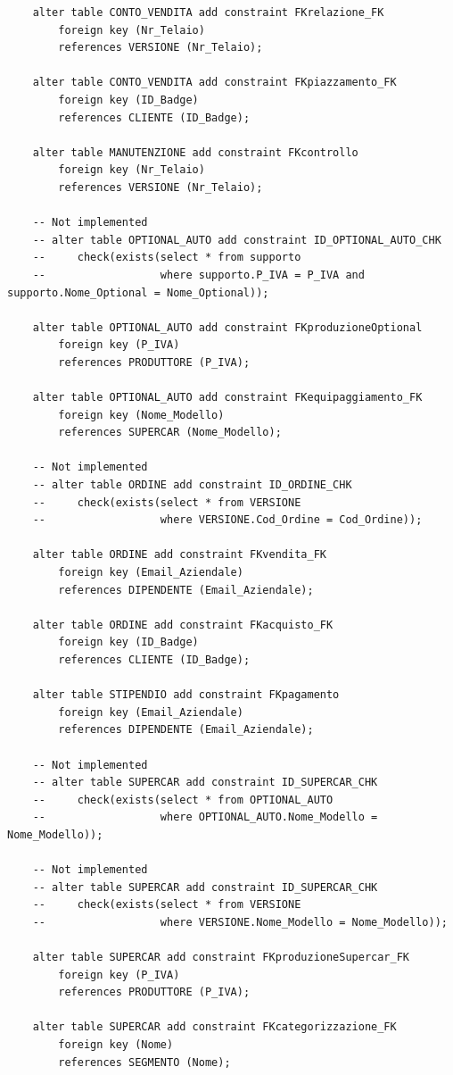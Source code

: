 \documentclass[11pt]{article}
\begin{document}
\begin{lstlisting}
    alter table CONTO_VENDITA add constraint FKrelazione_FK
        foreign key (Nr_Telaio)
        references VERSIONE (Nr_Telaio);

    alter table CONTO_VENDITA add constraint FKpiazzamento_FK
        foreign key (ID_Badge)
        references CLIENTE (ID_Badge);

    alter table MANUTENZIONE add constraint FKcontrollo
        foreign key (Nr_Telaio)
        references VERSIONE (Nr_Telaio);

    -- Not implemented
    -- alter table OPTIONAL_AUTO add constraint ID_OPTIONAL_AUTO_CHK
    --     check(exists(select * from supporto
    --                  where supporto.P_IVA = P_IVA and supporto.Nome_Optional = Nome_Optional)); 

    alter table OPTIONAL_AUTO add constraint FKproduzioneOptional
        foreign key (P_IVA)
        references PRODUTTORE (P_IVA);

    alter table OPTIONAL_AUTO add constraint FKequipaggiamento_FK
        foreign key (Nome_Modello)
        references SUPERCAR (Nome_Modello);

    -- Not implemented
    -- alter table ORDINE add constraint ID_ORDINE_CHK
    --     check(exists(select * from VERSIONE
    --                  where VERSIONE.Cod_Ordine = Cod_Ordine)); 

    alter table ORDINE add constraint FKvendita_FK
        foreign key (Email_Aziendale)
        references DIPENDENTE (Email_Aziendale);

    alter table ORDINE add constraint FKacquisto_FK
        foreign key (ID_Badge)
        references CLIENTE (ID_Badge);

    alter table STIPENDIO add constraint FKpagamento
        foreign key (Email_Aziendale)
        references DIPENDENTE (Email_Aziendale);

    -- Not implemented
    -- alter table SUPERCAR add constraint ID_SUPERCAR_CHK
    --     check(exists(select * from OPTIONAL_AUTO
    --                  where OPTIONAL_AUTO.Nome_Modello = Nome_Modello)); 

    -- Not implemented
    -- alter table SUPERCAR add constraint ID_SUPERCAR_CHK
    --     check(exists(select * from VERSIONE
    --                  where VERSIONE.Nome_Modello = Nome_Modello)); 

    alter table SUPERCAR add constraint FKproduzioneSupercar_FK
        foreign key (P_IVA)
        references PRODUTTORE (P_IVA);

    alter table SUPERCAR add constraint FKcategorizzazione_FK
        foreign key (Nome)
        references SEGMENTO (Nome);


\end{lstlisting}
\end{document}
